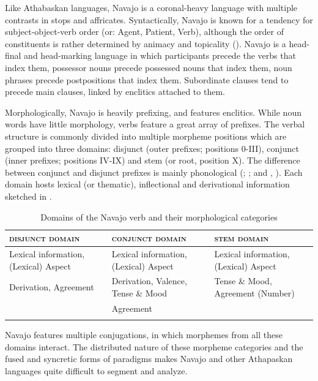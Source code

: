 Like Athabaskan languages, Navajo is a coronal-heavy language with multiple contrasts in stops and affricates. Syntactically, Navajo is known for a tendency for subject-object-verb order (or: Agent, Patient, Verb), although the order of constituents is rather determined by animacy and topicality (\cite{Willie:2000up}). Navajo is a head-final and head-marking language in which participants precede the verbs that index them, possessor nouns precede possessed nouns that index them, noun phrases precede postpositions that index them. Subordinate clauses tend to precede main clauses, linked by enclitics attached to them.

Morphologically, Navajo is heavily prefixing, and features enclitics. While noun words have little morphology, verbs feature a great array of prefixes. The verbal structure is commonly divided into multiple morpheme positions which are grouped into three domains: disjunct (outer prefixes; positions 0-III), conjunct (inner prefixes; positions IV-IX) and stem (or root, position X). The difference between conjunct and disjunct prefixes is mainly phonological (\cite{Sapir:1967pj}; \cite{Kari:1973jy,Kari:1975tg}; and \cite{Young:1987uj}, \cite{McDonough:1995hp}). Each domain hosts lexical (or thematic), inflectional and derivational information sketched in .

\begin{table}
\caption{Domains of the Navajo verb and their morphological categories}
\label{tab:navverb}
\begin{tabularx}{\textwidth}{QQQ}
    \lsptoprule
    \textsc{disjunct domain}&\textsc{conjunct domain}&\textsc{stem domain}\\
    \midrule
    Lexical information, (Lexical) Aspect&Lexical information, (Lexical) Aspect&Lexical information, (Lexical) Aspect\\
    \tablevspace
    Derivation, Agreement&Derivation, Valence, Tense \& Mood&Tense \& Mood, Agreement (Number)\\
    \tablevspace
    &Agreement&\\
    \lspbottomrule
\end{tabularx}
\end{table}

Navajo features multiple conjugations, in which morphemes from all these domains interact. The distributed nature of these morpheme categories and the fused and syncretic forms of paradigms makes Navajo and other Athapaskan languages quite difficult to segment and analyze.


